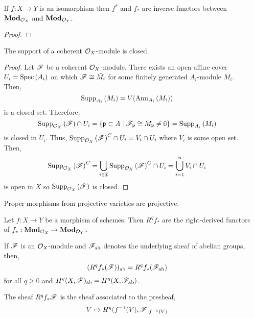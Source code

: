 \documentclass[12pt]{article}
\begin{document}
\begin{lemma}
If $f : X \to Y$ is an isomorphism then $f^*$ and $f_*$ are inverse functors between $\mathbf{Mod}_{\mathcal{O}_{X}}$ and $\mathbf{Mod}_{\mathcal{O}_{Y}}$. 
\end{lemma}

\begin{proof}

\end{proof}

\begin{lemma}
The support of a coherent $\mathcal{O}_{X}$-module is closed. 
\end{lemma}

\begin{proof}
Let $\mathscr{F}$ be a coherent $\mathcal{O}_{X}$-module. There exists an open affine cover $U_i = \mathrm{Spec}\left( A_i \right)$ on which $\mathscr{F} \cong \tilde{M_i}$ for some finitely generated $A_i$-module $M_i$. Then,
\[ \mathrm{Supp}_{A_i}\left(M_i \right) = V(\mathrm{Ann}_{A_i}\left(M_i\right)) \]
is a closed set. Therefore, 
\[ \mathrm{Supp}_{\mathcal{O}_{X}}\left(\mathscr{F} \right) \cap U_i = \{ \mathfrak{p} \subset A \mid \mathscr{F}_{\mathfrak{p}} \cong M_{\mathfrak{p}} \neq 0 \} = \mathrm{Supp}_{A_i}\left(M_i \right) \]
is closed in $U_i$. Thus, $\mathrm{Supp}_{\mathcal{O}_{X}}\left(\mathscr{F} \right)^C \cap U_i = V_i \cap U_i$ where $V_i$ is some open set. Then,
\begin{align*}
\mathrm{Supp}_{\mathcal{O}_{X}}\left(\mathscr{F} \right)^C = \bigcup_{i \in \mathcal{I}} \mathrm{Supp}_{\mathcal{O}_{X}}\left(\mathscr{F} \right)^C \cap U_i = \bigcup_{i = 1}^n V_i \cap U_i 
\end{align*}
is open in $X$ so $\mathrm{Supp}_{\mathcal{O}_{X}}\left(\mathscr{F} \right)$ is closed.
\end{proof}

\begin{lemma}
Proper morphisms from projective varieties are projective. 
\end{lemma}

\begin{definition}
Let $f : X \to Y$ be a morphism of schemes. Then $R^q f_*$ are the right-derived functors of $f_* : \mathbf{Mod}_{\mathcal{O}_{X}} \to \mathbf{Mod}_{\mathcal{O}_{Y}}$. 
\end{definition}


\begin{proposition}
If $\mathscr{F}$ is an $\mathcal{O}_{X}$-module and $\mathscr{F}_{\mathrm{ab}}$ denotes the underlying sheaf of abelian groups, then,
\[ (R^q f_* (\mathscr{F}))_{\mathrm{ab}} = R^q f_*(\mathscr{F}_{\mathrm{ab}}) \]
for all $q \ge 0$ and $H^q(X, \mathscr{F})_{\mathrm{ab}} = H^q(X, \mathscr{F}_{\mathrm{ab}})$. 
\end{proposition}

\begin{theorem}
The sheaf $R^q f_* \mathscr{F}$ is the sheaf associated to the presheaf,
\[ V \mapsto H^q(f^{-1}(V), \mathscr{F}|_{f^{-1}(V)} \]
\end{theorem}
\end{document}
